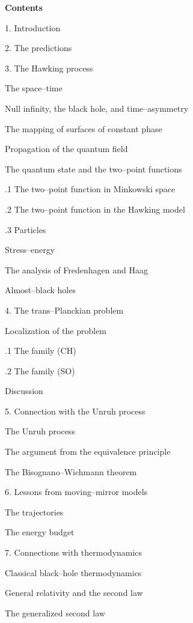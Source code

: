 
\date

\noindent\bf Contents \rm

1. Introduction 

2. The predictions

3. The Hawking process

 The space--time

 Null infinity, the black hole, and time--asymmetry

 The mapping of surfaces of constant phase

 Propagation of the quantum field

 The quantum state and the two--point functions

\qquad{}.1 The two--point function in Minkowski space

\qquad{}.2 The two--point function in the Hawking model

\qquad{}.3 Particles

 Stress--energy

 The analysis of Fredenhagen and Haag

 Almost--black holes

4. The trans--Planckian problem

 Localization of the problem

\qquad{}.1 The family (CH)

\qquad{}.2 The family (SO)

 Discussion

5. Connection with the Unruh process

 The Unruh process

 The argument from the equivalence principle

 The Bisognano--Wichmann theorem

6. Lessons from moving--mirror models

 The trajectories

 The energy budget

7. Connections with thermodynamics

 Classical black--hole thermodynamics

 General relativity and the second law

 The generalized second law

